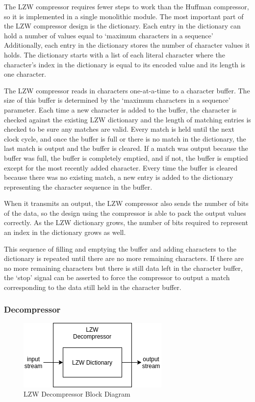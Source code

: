 \documentclass[doublespace,nopageskip]{VTthesis}
\begin{document}
The LZW compressor requires fewer steps to work than the Huffman compressor, so it is implemented in a single monolithic module. The most important part of the LZW compressor design is the dictionary. Each entry in the dictionary can hold a number of values equal to `maximum characters in a sequence' Additionally, each entry in the dictionary stores the number of character values it holds. The dictionary starts with a list of each literal character where the character's index in the dictionary is equal to its encoded value and its length is one character.

The LZW compressor reads in characters one-at-a-time to a character buffer. The size of this buffer is determined by the `maximum characters in a sequence' parameter. Each time a new character is added to the buffer, the character is checked against the existing LZW dictionary and the length of matching entries is checked to be sure any matches are valid. Every match is held until the next clock cycle, and once the buffer is full or there is no match in the dictionary, the last match is output and the buffer is cleared. If a match was output because the buffer was full, the buffer is completely emptied, and if not, the buffer is emptied except for the most recently added character. Every time the buffer is cleared because there was no existing match, a new entry is added to the dictionary representing the character sequence in the buffer.

When it transmits an output, the LZW compressor also sends the number of bits of the data, so the design using the compressor is able to pack the output values correctly. As the LZW dictionary grows, the number of bits required to represent an index in the dictionary grows as well.

This sequence of filling and emptying the buffer and adding characters to the dictionary is repeated until there are no more remaining characters. If there are no more remaining characters but there is still data left in the character buffer, the `stop' signal can be asserted to force the compressor to output a match corresponding to the data still held in the character buffer.

\subsubsection{Decompressor}\label{sss:lzw_decompressor_implementation}

\begin{figure}[htb]
	\centering
	\includegraphics[scale=1]{LZW Decompressor.png}
	\caption{LZW Decompressor Block Diagram}
	\label{fig:lzw_decompressor_block_diagram}
\end{figure}
\end{document}
